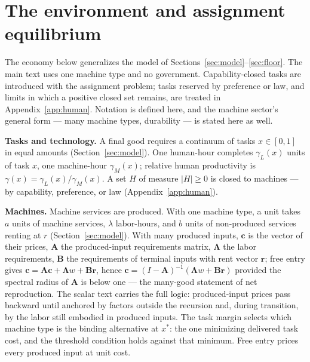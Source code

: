 \documentclass[12pt]{article}
\theoremstyle{plain}
\begin{document}
\appendix
{}

\section{The environment and assignment equilibrium}\label{app:environment}

The economy below generalizes the model of
Sections~\ref{sec:model}--\ref{sec:floor}. The main text uses one machine
type and no government. Capability-closed tasks are introduced with the
assignment problem; tasks reserved by preference or law, and limits in which
a positive closed set remains, are treated in Appendix~\ref{app:human}. Notation is defined here, and the machine sector's general form --- many machine types, durability --- is stated here as well.

\textbf{Tasks and technology.} A final good requires a continuum of tasks $x\in[0,1]$ in equal amounts (Section~\ref{sec:model}). One human-hour completes $\gamma _L(x)$ units of task $x$, one machine-hour $\gamma _M(x)$; relative human productivity is $\gamma (x) = \gamma _L(x)/\gamma _M(x)$. A set $H$ of measure $|H| \ge 0$ is closed to machines --- by capability, preference, or law (Appendix~\ref{app:human}).

\textbf{Machines.} Machine services are produced. With one machine type, a unit takes $a$ units of machine services, $\lambda$ labor-hours, and $b$ units of non-produced services renting at $r$ (Section~\ref{sec:model}). With many produced inputs, $\mathbf{c}$ is the vector of their prices, $\mathbf{A}$ the produced-input requirements matrix, $\boldsymbol{\Lambda}$ the labor requirements, $\mathbf{B}$ the requirements of terminal inputs with rent vector $\mathbf{r}$; free entry gives $\mathbf{c} = \mathbf{A}\mathbf{c} + \boldsymbol{\Lambda}w + \mathbf{B}\mathbf{r}$, hence $\mathbf{c} = (I-\mathbf{A})^{-1}(\boldsymbol{\Lambda}w + \mathbf{B}\mathbf{r})$ provided the spectral radius of $\mathbf{A}$ is below one --- the many-good statement of net reproduction. The scalar text carries the full logic: produced-input prices pass backward until anchored by factors outside the recursion and, during transition, by the labor still embodied in produced inputs. The task margin selects which machine type is the binding alternative at $x^*$: the one minimizing delivered task cost, and the threshold condition holds against that minimum. Free entry prices every produced input at unit cost.
\end{document}
